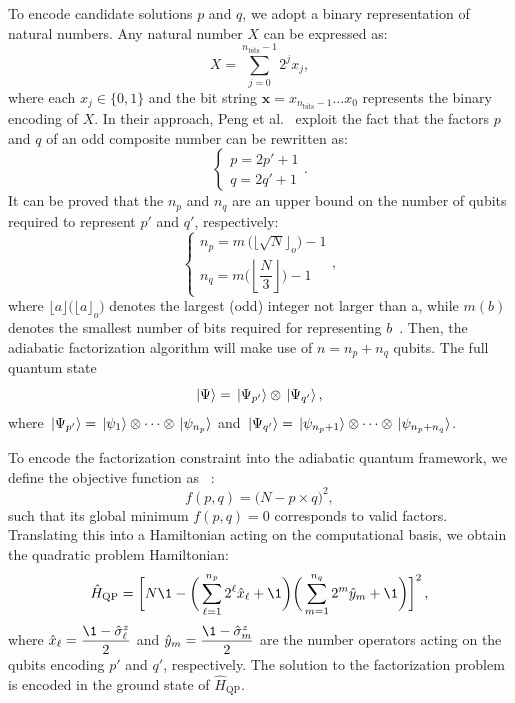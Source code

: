 To encode candidate solutions $p$ and $q$, we adopt a binary representation of natural numbers. Any natural number $X$ can be expressed as:
\begin{equation}
	X = \sum_{j=0}^{n_\text{bits} - 1} 2^j x_j,
	\label{eq:binary_integer}
\end{equation}
where each $x_j \in \{0,1\}$ and the bit string $\mathbf{x} = x_{n_\text{bits}-1} \dots x_0$ represents the binary encoding of $X$. In their approach, Peng et al.~\cite{peng_quantum_2008} exploit the fact that the factors $p$ and $q$ of an odd composite number can be rewritten as:
\begin{equation}
	\begin{cases}
		p = 2p' + 1 \\
		q = 2q' + 1
	\end{cases} .
	\label{eq:factors_simplification}
\end{equation}
It can be proved that the $n_p$ and $n_q$ are an upper bound on the number of qubits required to represent $p'$ and $q'$, respectively:
\begin{equation}
	\begin{cases}
		n_p = m\,\big(\lfloor \sqrt{N} \rfloor_o\big) - 1 \\[2ex]
		n_q = m\bigg(\left\lfloor \dfrac{N}{3} \right\rfloor \bigg) - 1
	\end{cases} ,
	\label{eq:factors_num_bits}
\end{equation}
where $\lfloor a \rfloor \big(\lfloor a \rfloor_o\big)$ denotes the largest (odd) integer not larger than a, while $m(b)$ denotes the smallest number of bits required for representing $b$~\cite{peng_quantum_2008}. Then, the adiabatic factorization algorithm will make use of $n = n_p + n_q$ qubits. The full quantum state 
\begin{equation}
	\ket{\Psi} = \ket*{\Psi_{p'}} \otimes \ket*{\Psi_{q'}},
	\label{eq:full_quantum_state}
\end{equation}
where $\ket*{\Psi_{p'}} = \ket*{\psi_{1}}\otimes \cdots \otimes \ket*{\psi_{n_p}}$ and $\ket*{\Psi_{q'}} = \ket*{\psi_{n_p+1}}\otimes \cdots \otimes \ket*{\psi_{n_p +n_q}}$.

To encode the factorization constraint into the adiabatic quantum framework, we define the objective function as ~\cite{peng_quantum_2008}:
\begin{equation}
	f(p,q) = \big(N - p \times q \big)^2,
\end{equation}
such that its global minimum $f(p,q)=0$ corresponds to valid factors. Translating this into a Hamiltonian acting on the computational basis, we obtain the quadratic problem Hamiltonian:
\begin{equation}
	\hat{H}_\mathrm{QP} = \bigg[ N \1 - \bigg( \sum_{\ell=1}^{n_p} 2^\ell \hat{x}_\ell + \1 \bigg)
	\bigg( \sum_{m=1}^{n_q} 2^m \hat{y}_m + \1 \bigg) \bigg]^2\,,
	\label{eq:quadratic_problem_hamiltonian}
\end{equation}
where $\hat{x}_\ell = \dfrac{\1 - \hat{\sigma}_\ell^z}{2}$ and $\hat{y}_m = \dfrac{\1 - \hat{\sigma}_m^z}{2}$ are the number operators acting on the qubits encoding $p'$ and $q'$, respectively. The solution to the factorization problem is encoded in the ground state of $\hat{H}_\mathrm{QP}$.

